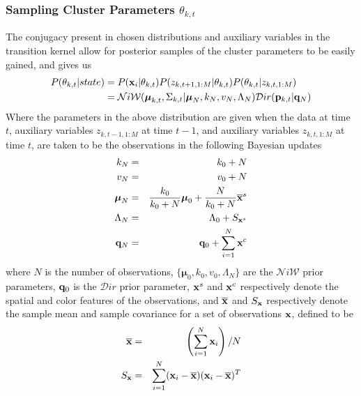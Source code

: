 \documentclass[smallcondensed, final]{svjour3}
\begin{document}
\subsubsection{Sampling Cluster Parameters $\theta_{k, t}$}
The conjugacy present in chosen distributions and auxiliary variables in the transition kernel allow for posterior samples of the cluster parameters to be easily gained, and gives us
\begin{align}
\begin{split}
P(\theta_{k,t} | state) & = P(\bold{x}_{i} | \theta_{k,t}) P(z_{k,t+1,1:M} | \theta_{k,t})  P(\theta_{k,t} | z_{k,t,1:M}) \\
 & = \mathcal{N}i\mathcal{W}(\boldsymbol{\mu}_{k,t}, \Sigma_{k,t} | \boldsymbol{\mu}_{N}, k_{N}, v_{N}, \Lambda_{N})  \mathcal{D}ir( \bold{p}_{k,t} | \bold{q}_{N})
\end{split}
\end{align}
Where the parameters in the above distribution are given when the data at time $t$, auxiliary variables $z_{k,t-1,1:M}$ at time $t-1$, and auxiliary variables $z_{k,t,1:M}$ at time $t$, are taken to be the observations in the following Bayesian updates
\begin{eqnarray}
k_{N} &=& k_{0} + N \\
v_{N} &=& v_{0} + N \\
\boldsymbol{\mu}_{N} &=& \frac{k_{0}}{k_{0}+N} \boldsymbol{\mu}_{0}  +  \frac{N}{k_{0}+N} \overline{\bold{x}}^{s}\\
\Lambda_{N} &=& \Lambda_{0} + S_{\bold{x}^{s}}\\
\bold{q}_{N} &=& \bold{q}_{0} + \sum_{i=1}^{N} \bold{x}^{c}
\end{eqnarray}
where $N$ is the number of observations, $\{ \boldsymbol{\mu}_{0}, k_{0}, v_{0}, \Lambda_{N} \}$ are the $\mathcal{N}i\mathcal{W}$ prior parameters, $\bold{q}_{0}$ is the $\mathcal{D}ir$ prior parameter, $\bold{x}^{s}$ and $\bold{x}^{c}$ respectively denote the spatial and color features of the observations, and $\overline{\bold{x}}$ and $S_{\bold{x}}$ respectively denote the sample mean and sample covariance for a set of observations $\bold{x}$, defined to be
\begin{eqnarray}
\overline{\bold{x}}  &=&  \left( \sum_{i=1}^{N} \bold{x}_{i} \right) / N\\
S_{\bold{x}}  &=&  \sum_{i=1}^{N} (\bold{x}_{i} - \overline{\bold{x}}) (\bold{x}_{i} - \overline{\bold{x}})^{T}
\end{eqnarray}
\end{document}
